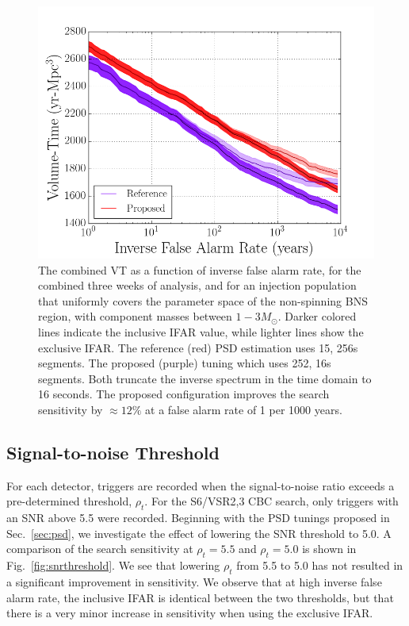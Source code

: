 \begin{figure}
\centering
\includegraphics[width=1.0\textwidth]{papers/bns_o1_dev/figures/psd_combined.png}
\caption{\label{fig:psd} 
The combined VT as a function of inverse false alarm rate, for the combined three weeks of analysis, and for an injection population that uniformly covers the parameter space of the non-spinning BNS region, with component masses between $1- 3M_\odot$. Darker colored lines indicate the inclusive IFAR value, while lighter lines show the exclusive IFAR. The reference (red) PSD estimation uses 15, 256s segments. The proposed (purple) tuning which uses 252, 16s segments. Both truncate the inverse spectrum in the time domain to 16 seconds. The proposed configuration improves the search sensitivity by $\approx 12\% $ at a false alarm rate of 1 per 1000 years.
}
\end{figure}

\subsection{Signal-to-noise Threshold}
\label{sec:snr}

For each detector, triggers are recorded when the signal-to-noise ratio exceeds a pre-determined threshold, $\rho_t$. For the S6/VSR2,3 CBC search, only triggers with an SNR above 5.5 were recorded. Beginning with the PSD tunings proposed in Sec.~\ref{sec:psd}, we investigate the effect of lowering the SNR threshold to 5.0. A comparison of the search sensitivity at $\rho_t=5.5$ and $\rho_t=5.0$ is shown in Fig.~\ref{fig:snrthreshold}. We see that lowering $\rho_t$ from 5.5 to 5.0 has not resulted in a significant improvement in sensitivity. We observe that at high inverse false alarm rate, the inclusive IFAR is identical between the two thresholds, but that there is a very minor increase in sensitivity when using the exclusive IFAR.


